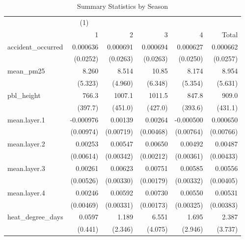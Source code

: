 \begin{table}[htbp]\centering
\caption{Summary Statistics by Season\label{sumstats\_season}}
\begin{tabular}{l*{5}{D{.}{.}{-1}}}
\toprule
                    &&            &            &            &            \\
                    &           1&           2&           3&           4&       Total\\
\midrule
accident\_occurred   &    0.000636&    0.000691&    0.000694&    0.000627&    0.000662\\
                    &    (0.0252)&    (0.0263)&    (0.0263)&    (0.0250)&    (0.0257)\\
\addlinespace
mean\_pm25           &       8.260&       8.514&       10.85&       8.174&       8.954\\
                    &     (5.323)&     (4.960)&     (6.348)&     (5.354)&     (5.631)\\
\addlinespace
pbl\_height          &       766.3&      1007.1&      1011.5&       847.8&       909.0\\
                    &     (397.7)&     (451.0)&     (427.0)&     (393.6)&     (431.1)\\
\addlinespace
mean.layer.1        &   -0.000976&     0.00139&     0.00264&   -0.000500&    0.000650\\
                    &   (0.00974)&   (0.00719)&   (0.00468)&   (0.00764)&   (0.00766)\\
\addlinespace
mean.layer.2        &     0.00253&     0.00547&     0.00650&     0.00492&     0.00487\\
                    &   (0.00614)&   (0.00342)&   (0.00212)&   (0.00361)&   (0.00433)\\
\addlinespace
mean.layer.3        &     0.00261&     0.00623&     0.00751&     0.00585&     0.00556\\
                    &   (0.00526)&   (0.00330)&   (0.00179)&   (0.00332)&   (0.00405)\\
\addlinespace
mean.layer.4        &     0.00246&     0.00592&     0.00730&     0.00550&     0.00531\\
                    &   (0.00469)&   (0.00331)&   (0.00173)&   (0.00325)&   (0.00383)\\
\addlinespace
heat\_degree\_days    &      0.0597&       1.189&       6.551&       1.695&       2.387\\
                    &     (0.441)&     (2.346)&     (4.075)&     (2.946)&     (3.737)\\

\end{tabular}
\end{table}
